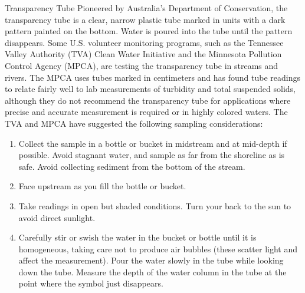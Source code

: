 \documentclass{article}
\begin{document}
Transparency Tube Pioneered by Australia's Department of Conservation,
the transparency tube is a clear, narrow plastic tube marked in units
with a dark pattern painted on the bottom. Water is poured into the tube
until the pattern disappears. Some U.S. volunteer monitoring programs,
such as the Tennessee Valley Authority (TVA) Clean Water Initiative and
the Minnesota Pollution Control Agency (MPCA), are testing the
transparency tube in streams and rivers. The MPCA uses tubes marked in
centimeters and has found tube readings to relate fairly well to lab
measurements of turbidity and total suspended solids, although they do
not recommend the transparency tube for applications where precise and
accurate measurement is required or in highly colored waters. The TVA
and MPCA have suggested the following sampling considerations:

\begin{enumerate}
\item
  Collect the sample in a bottle or bucket in midstream and at mid-depth
  if possible. Avoid stagnant water, and sample as far from the
  shoreline as is safe. Avoid collecting sediment from the bottom of the
  stream.
\item
  Face upstream as you fill the bottle or bucket.
\item
  Take readings in open but shaded conditions. Turn your back to the sun
  to avoid direct sunlight.
\item
  Carefully stir or swish the water in the bucket or bottle until it is
  homogeneous, taking care not to produce air bubbles (these scatter
  light and affect the measurement). Pour the water slowly in the tube
  while looking down the tube. Measure the depth of the water column in
  the tube at the point where the symbol just disappears.
\end{enumerate}
\end{document}

